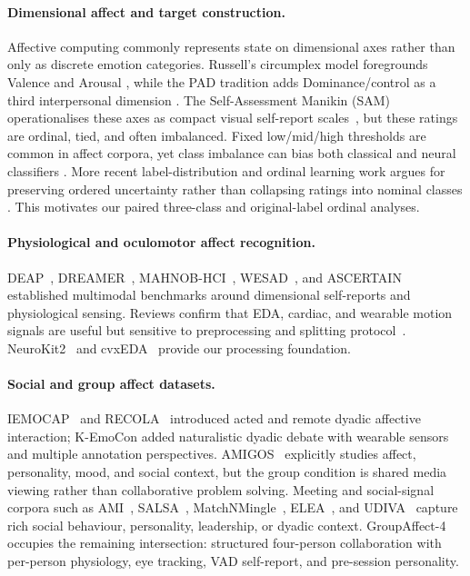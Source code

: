 \documentclass[sigconf,review,anonymous]{acmart}
\begin{document}
\paragraph{Dimensional affect and target construction.}
Affective computing commonly represents state on dimensional axes rather than
only as discrete emotion categories.
Russell's circumplex model foregrounds Valence and Arousal
\cite{russell1980circumplex}, while the PAD tradition adds
Dominance/control as a third interpersonal dimension
\cite{mehrabian1996pleasure}.
The Self-Assessment Manikin (SAM) operationalises these axes as compact
visual self-report scales~\cite{bradley1994sam}, but these ratings are
ordinal, tied, and often imbalanced.
Fixed low/mid/high thresholds are common in affect corpora, yet class
imbalance can bias both classical and neural classifiers
\cite{he2009imbalanced,johnson2019classimbalance}.  More recent
label-distribution and ordinal learning work argues for preserving ordered
uncertainty rather than collapsing ratings into nominal classes
\cite{geng2016label,wen2023ordinal}.  This motivates our paired
three-class and original-label ordinal analyses.

\paragraph{Physiological and oculomotor affect recognition.}
DEAP~\cite{koelstra2012deap}, DREAMER~\cite{katsigiannis2018dreamer},
MAHNOB-HCI~\cite{soleymani2012mahnob}, WESAD~\cite{schmidt2018wesad}, and
ASCERTAIN~\cite{subramanian2018ascertain} established multimodal benchmarks
around dimensional self-reports and physiological sensing.
Reviews confirm that EDA, cardiac, and wearable motion signals are useful but
sensitive to preprocessing and splitting
protocol~\cite{shu2018review,ahmad2022survey,kreibig2010autonomic}.
NeuroKit2~\cite{makowski2021neurokit2} and cvxEDA~\cite{greco2016cvxeda}
provide our processing foundation.

\paragraph{Social and group affect datasets.}
IEMOCAP~\cite{busso2008iemocap} and RECOLA~\cite{ringeval2013introducing}
introduced acted and remote dyadic affective interaction; K-EmoCon
\cite{park2020kemocon} added naturalistic dyadic debate with wearable sensors
and multiple annotation perspectives.  AMIGOS~\cite{mirandacorrea2021amigos}
explicitly studies affect, personality, mood, and social context, but the
group condition is shared media viewing rather than collaborative problem
solving.  Meeting and social-signal corpora such as AMI~\cite{mccowan2005ami},
SALSA~\cite{alameda2015salsa}, MatchNMingle~\cite{cabrera2018matchnmingle},
ELEA~\cite{sanchez2012emergent}, and UDIVA~\cite{palmero2021context}
capture rich social behaviour, personality, leadership, or dyadic context.
GroupAffect-4~\cite{groupaffect4} occupies the remaining intersection:
structured four-person collaboration with per-person physiology, eye tracking,
VAD self-report, and pre-session personality.
\end{document}

